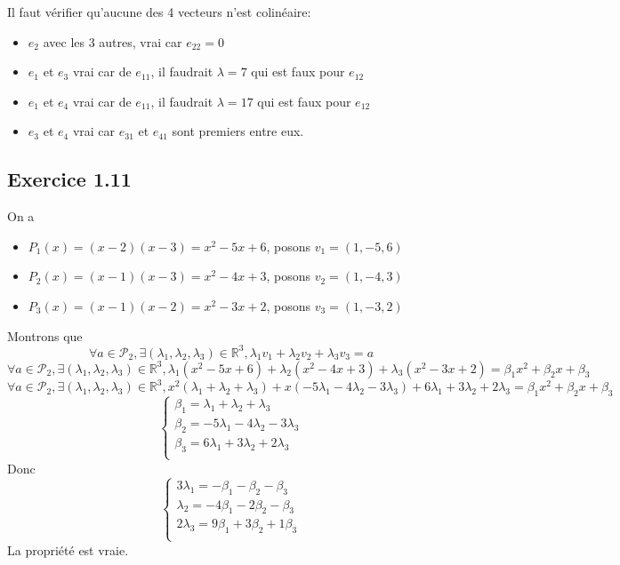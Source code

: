 \documentclass[]{book}
\theoremstyle{definition}
\newcommand{\bb}[1]{\mathbb{#1}}
\newcommand{\R}{\bb{R}}
\begin{document}
Il faut v\'erifier qu'aucune des 4 vecteurs n'est colin\'eaire: 
\begin{itemize}
\item $e_2$ avec les 3 autres, vrai car $e_{22} = 0$
\item $e_1$ et $e_3$ vrai car de $e_{11}$, il faudrait $\lambda=7$ qui est faux pour $e_{12}$
\item $e_1$ et $e_4$ vrai car de $e_{11}$, il faudrait $\lambda=17$ qui est faux pour $e_{12}$
\item $e_3$ et $e_4$ vrai car $e_{31}$ et $e_{41}$ sont premiers entre eux.
\end{itemize}

\subsection*{Exercice 1.11}
On a 
\begin{itemize}
\item $P_1(x) = (x-2)(x-3) = x^2 -5x + 6$, posons $v_1 = (1,-5,6)$
\item $P_2(x) = (x-1)(x-3) = x^2 -4x + 3$, posons $v_2 = (1,-4,3)$
\item $P_3(x) = (x-1)(x-2) = x^2 -3x + 2$, posons $v_3 = (1,-3,2)$
\end{itemize}

Montrons que
$$ \forall a \in \mathcal{P}_2, \exists (\lambda_1,\lambda_2,\lambda_3) \in \R^3,
\lambda_1 v_1 + \lambda_2 v_2 + \lambda_3 v_3 = a
$$
$$ \forall a \in \mathcal{P}_2, \exists (\lambda_1,\lambda_2,\lambda_3) \in \R^3,
\lambda_1 (x^2 -5x + 6) + \lambda_2 (x^2 -4x + 3) + \lambda_3 (x^2 -3x + 2) = \beta_1 x^2 + \beta_2 x + \beta_3
$$
$$ \forall a \in \mathcal{P}_2, \exists (\lambda_1,\lambda_2,\lambda_3) \in \R^3,
x^2 (\lambda_1 + \lambda_2 + \lambda_3) + x (-5\lambda_1 -4\lambda_2-3\lambda_3) + 6\lambda_1 + 3\lambda_2 + 2\lambda_3 = \beta_1 x^2 + \beta_2 x + \beta_3
$$
$$
\left\{ 
\begin{array}{l}
\beta_1 = \lambda_1 + \lambda_2 + \lambda_3 \\
\beta_2 = -5\lambda_1 -4\lambda_2-3\lambda_3 \\ 
\beta_3 = 6\lambda_1 + 3\lambda_2 + 2\lambda_3 \\
\end{array}
\right. 
$$
Donc
$$
\left\{ 
\begin{array}{l}
3\lambda_1 = -\beta_1 - \beta_2 - \beta_3 \\
\lambda_2 = -4\beta_1 - 2\beta_2 - \beta_3 \\
2\lambda_3 = 9\beta_1 + 3\beta_2 + 1\beta_3 \\
\end{array}
\right. 
$$
La propri\'et\'e est vraie.
\end{document}
